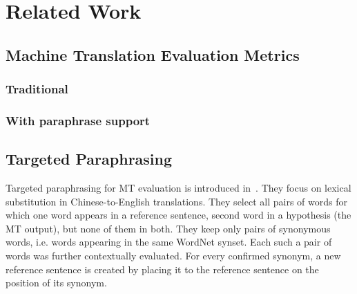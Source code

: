 \chapter{Related Work}


\section{Machine Translation Evaluation Metrics}
\subsection{Traditional}



\subsection{With paraphrase support}




\section{Targeted Paraphrasing}
Targeted paraphrasing for MT evaluation is introduced in~\citet{kauchak}. They 
focus on lexical substitution in Chinese-to-English translations. 
They select all pairs of words for which one word appears in a reference sentence,
second word in a hypothesis (the MT output), but none of them in both. They keep 
only pairs of synonymous words, i.e. words appearing in the same WordNet 
\cite{wordnet} synset. Each such a pair of words was further contextually evaluated. 
For every confirmed synonym, a new reference sentence is created by placing it to the
reference sentence on the position of its synonym.
